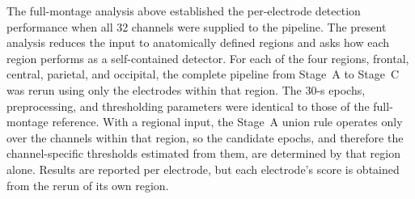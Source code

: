 The full-montage analysis above established the per-electrode detection performance when all 32 channels were supplied to the pipeline. The present analysis reduces the input to anatomically defined regions and asks how each region performs as a self-contained detector. For each of the four regions, frontal, central, parietal, and occipital, the complete pipeline from Stage~A to Stage~C was rerun using only the electrodes within that region. The 30-s epochs, preprocessing, and thresholding parameters were identical to those of the full-montage reference. With a regional input, the Stage~A union rule operates only over the channels within that region, so the candidate epochs, and therefore the channel-specific thresholds estimated from them, are determined by that region alone. Results are reported per electrode, but each electrode's score is obtained from the rerun of its own region.
